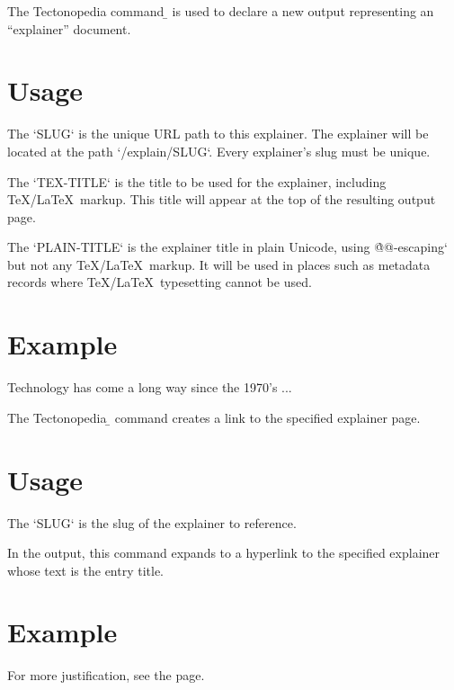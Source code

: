 
The Tectonopedia command \b{\string\Explainer} is used to declare a new output
representing an “explainer” document.

\section*{Usage}

\begin{texdisp}
\end{texdisp}

The \tex`SLUG` is the unique URL path to this explainer. The explainer will be
located at the path \tex`/explain/{SLUG}`. Every explainer's slug must be unique.

The \tex`TEX-TITLE` is the title to be used for the explainer, including
\TeX/\LaTeX\ markup. This title will appear at the top of the resulting output
page.

The \tex`PLAIN-TITLE` is the explainer title in plain Unicode, using
\`@@-escaping` but not any \TeX/\LaTeX\ markup. It will be used in places such
as metadata records where \TeX/\LaTeX\ typesetting cannot be used.

\section*{Example}

\begin{texdisp}

Technology has come a long way since the 1970's ...
\end{texdisp}



The Tectonopedia \b{\string\explain} command creates a link to the specified
explainer page.

\section*{Usage}

\begin{texdisp}
\end{texdisp}

The \tex`SLUG` is the slug of the explainer to reference.

In the output, this command expands to a hyperlink to the specified explainer whose
text is the entry title.

\section*{Example}

\begin{texdisp}
For more justification, see the  page.
\end{texdisp}
